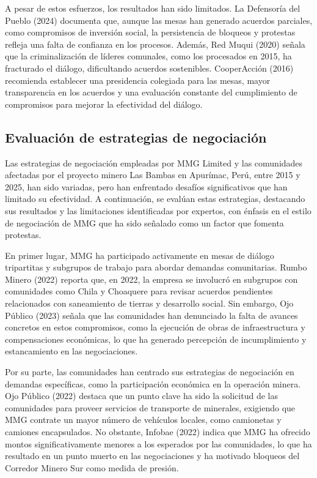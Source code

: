 \documentclass[
  stu,
  floatsintext,
  longtable,
  a4paper,
  nolmodern,
  notxfonts,
  notimes,
  colorlinks=true,linkcolor=blue,citecolor=blue,urlcolor=blue]{apa7}
\begin{document}
A pesar de estos esfuerzos, los resultados han sido limitados. La
Defensoría del Pueblo (2024) documenta que, aunque las mesas han
generado acuerdos parciales, como compromisos de inversión social, la
persistencia de bloqueos y protestas refleja una falta de confianza en
los procesos. Además, Red Muqui (2020) señala que la criminalización de
líderes comunales, como los procesados en 2015, ha fracturado el
diálogo, dificultando acuerdos sostenibles. CooperAcción (2016)
recomienda establecer una presidencia colegiada para las mesas, mayor
transparencia en los acuerdos y una evaluación constante del
cumplimiento de compromisos para mejorar la efectividad del diálogo.

\subsection{Evaluación de estrategias de
negociación}\label{evaluaciuxf3n-de-estrategias-de-negociaciuxf3n}

Las estrategias de negociación empleadas por MMG Limited y las
comunidades afectadas por el proyecto minero Las Bambas en Apurímac,
Perú, entre 2015 y 2025, han sido variadas, pero han enfrentado desafíos
significativos que han limitado su efectividad. A continuación, se
evalúan estas estrategias, destacando sus resultados y las limitaciones
identificadas por expertos, con énfasis en el estilo de negociación de
MMG que ha sido señalado como un factor que fomenta protestas.

En primer lugar, MMG ha participado activamente en mesas de diálogo
tripartitas y subgrupos de trabajo para abordar demandas comunitarias.
Rumbo Minero (2022) reporta que, en 2022, la empresa se involucró en
subgrupos con comunidades como Chila y Choaquere para revisar acuerdos
pendientes relacionados con saneamiento de tierras y desarrollo social.
Sin embargo, Ojo Público (2023) señala que las comunidades han
denunciado la falta de avances concretos en estos compromisos, como la
ejecución de obras de infraestructura y compensaciones económicas, lo
que ha generado percepción de incumplimiento y estancamiento en las
negociaciones.

Por su parte, las comunidades han centrado sus estrategias de
negociación en demandas específicas, como la participación económica en
la operación minera. Ojo Público (2022) destaca que un punto clave ha
sido la solicitud de las comunidades para proveer servicios de
transporte de minerales, exigiendo que MMG contrate un mayor número de
vehículos locales, como camionetas y camiones encapsulados. No obstante,
Infobae (2022) indica que MMG ha ofrecido montos significativamente
menores a los esperados por las comunidades, lo que ha resultado en un
punto muerto en las negociaciones y ha motivado bloqueos del Corredor
Minero Sur como medida de presión.
\end{document}
